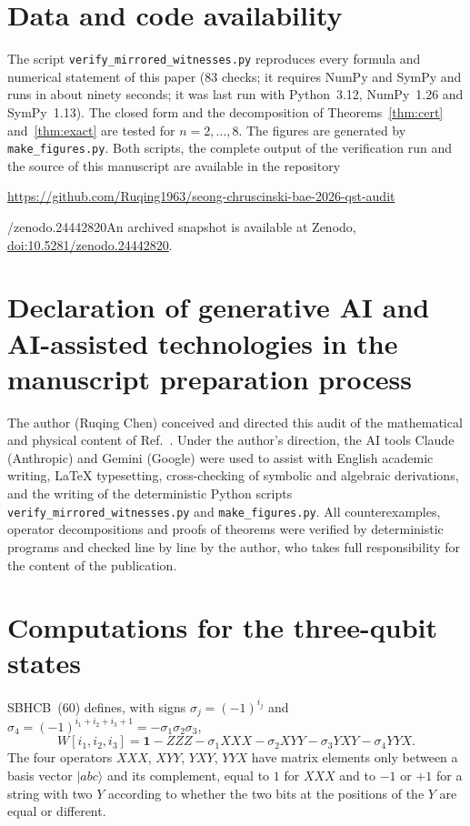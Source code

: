 \documentclass[11pt,a4paper]{article}
\theoremstyle{remark}
\newcommand{\ket}[1]{\lvert #1\rangle}
\newcommand{\id}{\mathbf{1}}
\def\zenodoDOI{10.5281/zenodo.24442820}
\def\zenodonote{\ifx\zenodoDOI\empty\else\noindent An archived snapshot is available at
Zenodo, \href{https://doi.org/\zenodoDOI}{doi:\zenodoDOI}.\fi}
\begin{document}
\section*{Data and code availability}

The script \texttt{verify\_mirrored\_witnesses.py} reproduces every formula and numerical
statement of this paper (83 checks; it requires NumPy and SymPy and runs in about ninety
seconds; it was last run with Python~3.12, NumPy~1.26 and SymPy~1.13). The closed form
and the decomposition of Theorems~\ref{thm:cert} and~\ref{thm:exact} are tested for
$n=2,\dots,8$. The figures are generated by \texttt{make\_figures.py}. Both scripts, the
complete output of the verification run and the source of this manuscript are available
in the repository
\begin{center}
\url{https://github.com/Ruqing1963/seong-chruscinski-bae-2026-qst-audit}
\end{center}
\zenodonote

\section*{Declaration of generative AI and AI-assisted technologies in the manuscript preparation process}

The author (Ruqing Chen) conceived and directed this audit of the mathematical and
physical content of Ref.~\cite{SBHCB26}. Under the author's direction, the AI tools Claude
(Anthropic) and Gemini (Google) were used to assist with English academic writing,
\LaTeX{} typesetting, cross-checking of symbolic and algebraic derivations, and the
writing of the deterministic Python scripts \texttt{verify\_mirrored\_witnesses.py} and
\texttt{make\_figures.py}. All counterexamples, operator decompositions and proofs of
theorems were verified by deterministic programs and checked line by line by the author,
who takes full responsibility for the content of the publication.

\appendix
\section{Computations for the three-qubit states}\label{app:pauli}

SBHCB~(60) defines, with signs $\sigma_j=(-1)^{i_j}$ and
$\sigma_4=(-1)^{i_1+i_2+i_3+1}=-\sigma_1\sigma_2\sigma_3$,
\begin{equation*}
W[i_1,i_2,i_3]=\id-ZZZ-\sigma_1XXX-\sigma_2XYY-\sigma_3YXY-\sigma_4YYX .
\end{equation*}
The four operators $XXX$, $XYY$, $YXY$, $YYX$ have matrix elements only between a basis
vector $\ket{abc}$ and its complement, equal to $1$ for $XXX$ and to $-1$ or $+1$ for a
string with two $Y$ according to whether the two bits at the positions of the $Y$ are
equal or different.
\end{document}
